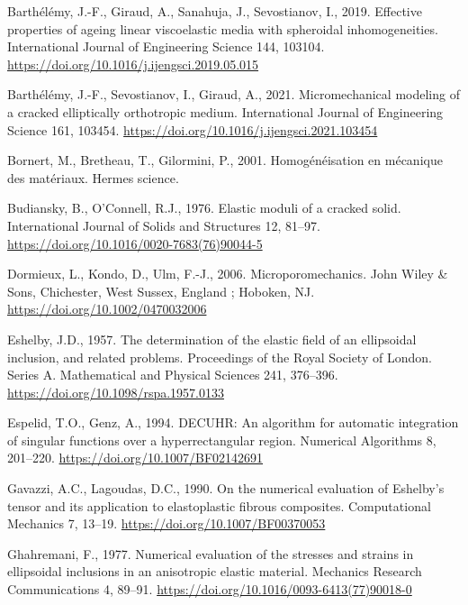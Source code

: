 \documentclass[
  a4paper,
  numbers=noendperiod,
  DIV=12]{scrreprt}
\newlength{\cslhangindent}
\newenvironment{CSLReferences}[2] %
 {\begin{list}{}{%
  \setlength{\itemindent}{0pt}
  \setlength{\leftmargin}{0pt}
  \setlength{\parsep}{0pt}
  \ifodd #1
   \setlength{\leftmargin}{\cslhangindent}
   \setlength{\itemindent}{-1\cslhangindent}
  \fi
  \setlength{\itemsep}{#2\baselineskip}}}
 {\end{list}}
\begin{document}
\begin{CSLReferences}{1}{0}
Barthélémy, J.-F., Giraud, A., Sanahuja, J., Sevostianov, I., 2019.
Effective properties of ageing linear viscoelastic media with spheroidal
inhomogeneities. International Journal of Engineering Science 144,
103104. \url{https://doi.org/10.1016/j.ijengsci.2019.05.015}

Barthélémy, J.-F., Sevostianov, I., Giraud, A., 2021. Micromechanical
modeling of a cracked elliptically orthotropic medium. International
Journal of Engineering Science 161, 103454.
\url{https://doi.org/10.1016/j.ijengsci.2021.103454}

Bornert, M., Bretheau, T., Gilormini, P., 2001. Homogénéisation en
mécanique des matériaux. Hermes science.

Budiansky, B., O'Connell, R.J., 1976. Elastic moduli of a cracked solid.
International Journal of Solids and Structures 12, 81--97.
\url{https://doi.org/10.1016/0020-7683(76)90044-5}

Dormieux, L., Kondo, D., Ulm, F.-J., 2006. Microporomechanics. John
Wiley \& Sons, Chichester, West Sussex, England ; Hoboken, NJ.
\url{https://doi.org/10.1002/0470032006}

Eshelby, J.D., 1957. The determination of the elastic field of an
ellipsoidal inclusion, and related problems. Proceedings of the Royal
Society of London. Series A. Mathematical and Physical Sciences 241,
376--396. \url{https://doi.org/10.1098/rspa.1957.0133}

Espelid, T.O., Genz, A., 1994. {DECUHR}: An algorithm for automatic
integration of singular functions over a hyperrectangular region.
Numerical Algorithms 8, 201--220.
\url{https://doi.org/10.1007/BF02142691}

Gavazzi, A.C., Lagoudas, D.C., 1990. On the numerical evaluation of
{Eshelby}'s tensor and its application to elastoplastic fibrous
composites. Computational Mechanics 7, 13--19.
\url{https://doi.org/10.1007/BF00370053}

Ghahremani, F., 1977. Numerical evaluation of the stresses and strains
in ellipsoidal inclusions in an anisotropic elastic material. Mechanics
Research Communications 4, 89--91.
\url{https://doi.org/10.1016/0093-6413(77)90018-0}


\end{CSLReferences}
\end{document}
